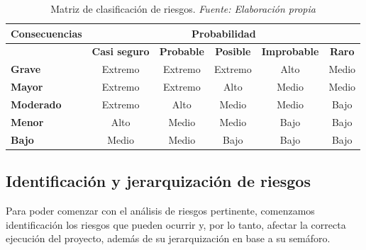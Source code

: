 \begin{table}[H]
	\centering
	\begin{tabular}{|>{\centering\arraybackslash}m{4cm}|c|c|c|c|c|}
		\hline
		\rowcolor{black!75} \color{white} {\textbf{Consecuencias}} & \multicolumn{5}{c|}{ \color{white} \textbf{Probabilidad}} \\ \cline{2-6}
		\cellcolor{white} & \textbf{Casi seguro} & \textbf{Probable} & \textbf{Posible} & \textbf{Improbable} & \textbf{Raro} \\ \hline
		\textbf{Grave} & \cellcolor{red!80}Extremo & \cellcolor{red!80}Extremo & \cellcolor{red!80}Extremo & \cellcolor{orange!80}Alto & \cellcolor{yellow!60}Medio \\ \hline
		\textbf{Mayor} & \cellcolor{red!80}Extremo & \cellcolor{red!80}Extremo & \cellcolor{orange!80}Alto & \cellcolor{yellow!60}Medio & \cellcolor{yellow!60}Medio \\ \hline
		\textbf{Moderado} & \cellcolor{red!80}Extremo & \cellcolor{orange!80}Alto & \cellcolor{yellow!60}Medio & \cellcolor{yellow!60}Medio & \cellcolor{green!60}Bajo \\ \hline
		\textbf{Menor} & \cellcolor{orange!80}Alto & \cellcolor{yellow!60}Medio & \cellcolor{yellow!60}Medio & \cellcolor{green!60}Bajo & \cellcolor{green!60}Bajo \\ \hline
		\textbf{Bajo} & \cellcolor{yellow!60}Medio & \cellcolor{yellow!60}Medio & \cellcolor{green!60}Bajo & \cellcolor{green!60}Bajo & \cellcolor{green!60}Bajo \\ \hline
	\end{tabular}
	\caption[Matriz de clasificación de riesgos.]{Matriz de clasificación de riesgos. \textit{Fuente: Elaboración propia}}
	\label{tabla:matriz_riesgos}
\end{table}


\subsection{Identificación y jerarquización de riesgos}
Para poder comenzar con el análisis de riesgos pertinente, comenzamos identificación los riesgos que pueden ocurrir y, por lo tanto, afectar la correcta ejecución del proyecto, además de su jerarquización en base a su semáforo.


